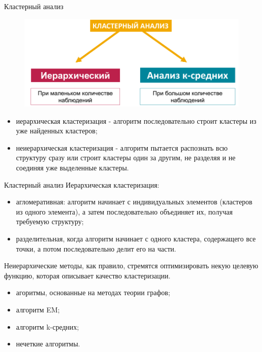 \documentclass{beamer}
\begin{document}
\begin{frame}{Кластерный анализ}
\begin{figure}[h]
\centering
\includegraphics[scale=0.5]{images/lec07-pic15.png}
\end{figure}
\begin{itemize}
\item иерархическая кластеризация - алгоритм последовательно строит кластеры из уже найденных кластеров;
\item неиерархическая кластеризация - алгоритм пытается распознать всю структуру сразу или строит кластеры один за другим, не разделяя и не соединяя уже выделенные кластеры.
\end{itemize}
\end{frame}

\begin{frame}{Кластерный анализ}
Иерархическая кластеризация:
\begin{itemize}
\item агломеративная: алгоритм начинает с индивидуальных элементов (кластеров из одного элемента), а затем последовательно объединяет их, получая требуемую структуру; 
\item разделительная, когда алгоритм начинает с одного кластера, содержащего все точки, а потом последовательно делит его на части.
\end{itemize}
Неиерархические методы, как правило, стремятся оптимизировать некую целевую функцию, которая описывает качество кластеризации. 
\begin{itemize}
\item агоритмы, основанные на методах теории графов;
\item алгоритм EM;
\item алгоритм k-средних;
\item нечеткие алгоритмы.
\end{itemize}
\end{frame}
\end{document}

